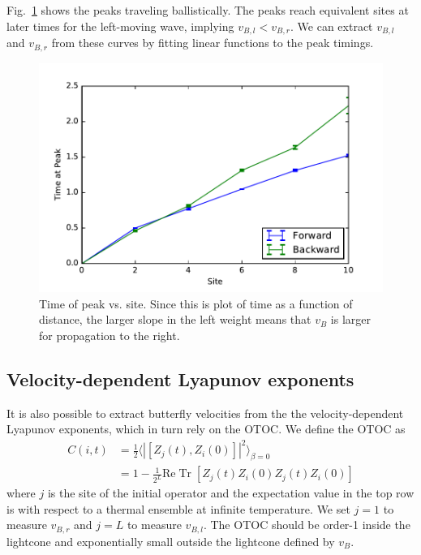 \documentclass[aps,prx,reprint,superscriptaddress, longbibliography]{revtex4-1}
\newcommand{\Tr}{ \mbox{Tr}}
\renewcommand{\Re}{ \mbox{Re}}
\newcommand{\half}{\frac{1}{2}}
\begin{document}
Fig.~\ref{fig:Rweightpeaktimes} shows the peaks traveling ballistically. The peaks reach equivalent sites at later times for the left-moving wave, implying $v_{B,l}<v_{B,r}$. We can extract $v_{B,l}$ and $v_{B,r}$ from these curves by fitting linear functions to the peak timings.

\begin{figure}
	\includegraphics[width=\columnwidth]{Rweightpeaktimes}
	\caption{Time of peak vs. site. Since this is plot of time as a function of distance, the larger slope in the left weight means that $v_B$ is larger for propagation to the right. }
	\label{fig:Rweightpeaktimes}
\end{figure}

\subsection{Velocity-dependent Lyapunov exponents}

It is also possible to extract butterfly velocities from the the velocity-dependent Lyapunov exponents, which in turn rely on the OTOC. We define the OTOC as 
\begin{align}
C(i,t) & = \half \langle|[Z_j(t),Z_i(0)]|^2\rangle_{\beta=0}\nonumber\\
&= 1 - \frac{1}{2^{L}}\Re\;\Tr\;[Z_j(t)Z_i(0)Z_j(t)Z_i(0)]
\end{align}
where $j$ is the site of the initial operator and the expectation value in the top row is with respect to a thermal ensemble at infinite temperature. We set $j=1$ to measure $v_{B,r}$ and $j=L$ to measure $v_{B,l}$. The OTOC should be order-1 inside the lightcone and exponentially small outside the lightcone defined by $v_B$.
\end{document}
